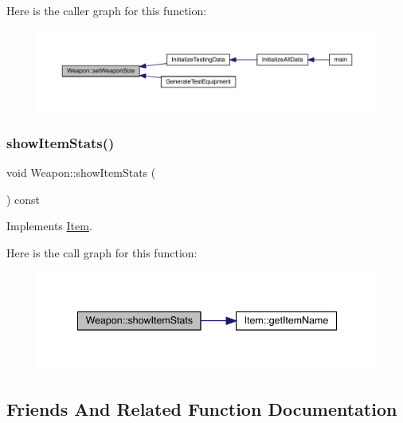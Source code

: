 Here is the caller graph for this function\+:
\nopagebreak
\begin{figure}[H]
\begin{center}
\leavevmode
\includegraphics[width=350pt]{db/de5/class_weapon_a78e4b6c131a25e93f647594191bae38d_icgraph}
\end{center}
\end{figure}
\mbox{\label{class_weapon_a5bd0118be0d84307c0865a63d907fec7}} 
\subsubsection{\texorpdfstring{show\+Item\+Stats()}{showItemStats()}}
{\footnotesize\ttfamily void Weapon\+::show\+Item\+Stats (\begin{DoxyParamCaption}{ }\end{DoxyParamCaption}) const\hspace{0.3cm}{\ttfamily [virtual]}}



Implements \mbox{\hyperlink{class_item_aaf7dae41afdce432c11261043e8e4e30}{Item}}.

Here is the call graph for this function\+:
\nopagebreak
\begin{figure}[H]
\begin{center}
\leavevmode
\includegraphics[width=341pt]{db/de5/class_weapon_a5bd0118be0d84307c0865a63d907fec7_cgraph}
\end{center}
\end{figure}


\subsection{Friends And Related Function Documentation}
\mbox{\label{class_weapon_aad85754f188b769ff61150eaf36106c4}} 
